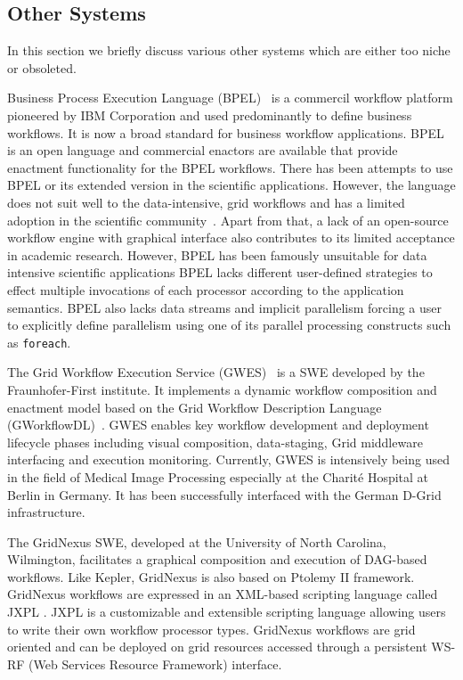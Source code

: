 
\subsection{Other Systems}
In this section we briefly discuss various other systems which are either too
niche or obsoleted.

Business Process Execution Language (BPEL)~\cite{bpel} is a commercil workflow
platform pioneered by IBM Corporation and used predominantly to define business
workflows. It is now a broad standard for business workflow applications. BPEL
is an open language and commercial enactors are available that provide
enactment functionality for the BPEL workflows. There has been attempts to use
BPEL or its extended version in the scientific applications. However, the
language does not suit well to the data-intensive, grid workflows and has a
limited adoption in the scientific
community~\cite{tan-missier-etal:2010,barga-gannon:2007,scherp-hoing-etal:2009}.
Apart from that, a lack of an open-source workflow engine with graphical
interface also contributes to its limited acceptance in academic research.
However, BPEL has been famously unsuitable for data intensive scientific
applications  BPEL lacks different user-defined strategies to effect multiple
invocations of each processor according to the application semantics. BPEL also
lacks data streams and implicit parallelism forcing a user to explicitly define
parallelism using one of its parallel processing constructs such as
\texttt{foreach}.

%
The Grid Workflow Execution Service (GWES)~\cite{Hoheisel2007} is a SWE
developed by the Fraunhofer-First institute. It implements a dynamic workflow
composition and enactment model based on the Grid Workflow Description Language
(GWorkflowDL)~\cite{Alt2006}.  GWES enables key workflow development and
deployment lifecycle phases including visual composition, data-staging, Grid
middleware interfacing and execution monitoring. Currently, GWES is intensively
being used in the field of Medical Image Processing especially at the
Charit\'{e} Hospital at Berlin in Germany.  It has been successfully interfaced
with the German D-Grid infrastructure.

%
The GridNexus \cite{GridNexus} SWE, developed at the University of North
Carolina, Wilmington, facilitates a graphical composition and execution of
DAG-based workflows. Like Kepler, GridNexus is also based on Ptolemy II
framework. GridNexus workflows are expressed in an XML-based scripting language
called JXPL \cite{hunt-ferner-etal:2005}. JXPL is a customizable and extensible
scripting language allowing users to write their own workflow processor types.
GridNexus workflows are grid oriented and can be deployed on grid resources
accessed through a persistent WS-RF (Web Services Resource Framework)
interface.

